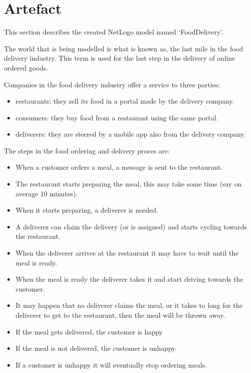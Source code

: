 \section{Artefact}\label{sec:artefact}
This section describes the created NetLogo model named `FoodDelivery'.

The world that is being modelled is what is known as, the last mile in the food delivery industry.
This term is used for the last step in the delivery of online ordered goods.

Companies in the food delivery industry offer a service to three parties:
\begin{itemize}
    \item restaurants: they sell its food in a portal made by the delivery company.
    \item consumers: they buy food from a restaurant using the same portal.
    \item deliverers: they are steered by a mobile app also from the delivery company.
\end{itemize}

The steps in the food ordering and delivery proces are:
\begin{itemize}
    \item When a customer orders a meal, a message is sent to the restaurant.
    \item The restaurant starts preparing the meal, this may take some time (say on average 10 minutes).
    \item When it starts preparing, a deliverer is needed.
    \item A deliverer can claim the delivery (or is assigned) and starts cycling towards the restaurant.
    \item When the deliverer arrives at the restaurant it may have to wait until the meal is ready.
    \item When the meal is ready the deliverer takes it and start driving towards the customer.
    \item It may happen that no deliverer claims the meal, or it takes to long for the deliverer to get to the restaurant,
then the meal will be thrown away.
    \item If the meal gets delivered, the customer is happy
    \item If the meal is not delivered, the customer is unhappy.
    \item If a customer is unhappy it will eventually stop ordering meals.
\end{itemize}

